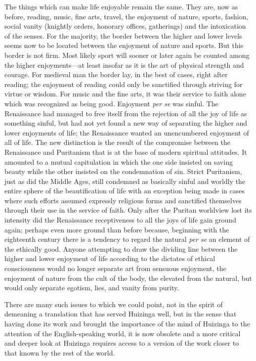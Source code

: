 The things which can make life enjoyable remain the same. They are, now
as before, reading, music, fine arts, travel, the enjoyment of nature,
sports, fashion, social vanity (knightly orders, honorary offices,
gatherings) and the intoxication of the senses. For the majority, the
border between the higher and lower levels seems now to be located
between the enjoyment of nature and sports. But this border is not firm.
Most likely sport will sooner or later again be counted among the higher
enjoyments---at least insofar as it is the art of physical strength and
courage. For medieval man the border lay, in the best of cases, right
after reading; the enjoyment of reading could only be sanctified through
striving for virtue or wisdom. For music and the fine arts, it was their
service to faith alone which was recognized as being good. Enjoyment
\emph{per se} was sinful. The Renaissance had managed to free itself
from the rejection of all the joy of life as something sinful, but had
not yet found a new way of separating the higher and lower enjoyments of
life; the Renaissance wanted an unencumbered enjoyment of all of life.
The new distinction is the result of the compromise between the
Renaissance and Puritanism that is at the base of modern spiritual
attitudes. It amounted to a mutual capitulation in which the one side
insisted on saving beauty while the other insisted on the condemnation
of sin. Strict Puritanism, just as did the Middle Ages, still condemned
as basically sinful and worldly the entire sphere of the beautification
of life with an exception being made in cases where such efforts assumed
expressly religious forms and sanctified themselves through their use in
the service of faith. Only
\protect\hypertarget{05_TRANSLATOR_S_INTRODUCTION.xhtmlux5cux23page_xvii}{}{}after
the Puritan worldview lost its intensity did the Renaissance
receptiveness to all the joys of life gain ground again; perhaps even
more ground than before because, beginning with the eighteenth century
there is a tendency to regard the natural \emph{per se} an element of
the ethically good. Anyone attempting to draw the dividing line between
the higher and lower enjoyment of life according to the dictates of
ethical consciousness would no longer separate art from sensuous
enjoyment, the enjoyment of nature from the cult of the body, the
elevated from the natural, but would only separate egotism, lies, and
vanity from purity.

There are many such issues to which we could point, not in the spirit of
demeaning a translation that has served Huizinga well, but in the sense
that having done its work and brought the importance of the mind of
Huizinga to the attention of the English-speaking world, it is now
obsolete and a more critical and deeper look at Huizinga requires access
to a version of the work closer to that known by the rest of the world.

